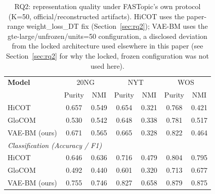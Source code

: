 \begin{table}[t]
\centering
\small
\begin{tabular}{lcccccc}
\toprule
\textbf{Model} & \multicolumn{2}{c}{20NG} & \multicolumn{2}{c}{NYT} & \multicolumn{2}{c}{WOS} \\
 & Purity & NMI & Purity & NMI & Purity & NMI \\
\midrule
HiCOT & 0.657 & 0.549 & 0.654 & 0.321 & 0.768 & 0.421 \\
GloCOM & 0.530 & 0.542 & 0.648 & 0.338 & 0.781 & 0.517 \\
VAE-BM (ours) & 0.671 & 0.565 & 0.665 & 0.328 & 0.822 & 0.464 \\
\midrule
\multicolumn{7}{l}{\textit{Classification (Accuracy / F1)}} \\
HiCOT & 0.646 & 0.636 & 0.716 & 0.479 & 0.804 & 0.795 \\
GloCOM & 0.492 & 0.440 & 0.601 & 0.320 & 0.713 & 0.677 \\
VAE-BM (ours) & 0.755 & 0.746 & 0.827 & 0.658 & 0.879 & 0.875 \\
\bottomrule
\end{tabular}
\caption{RQ2: representation quality under FASTopic's own protocol (K=50, official/reconstructed artifacts). HiCOT uses the paper-range weight\_loss\_DT fix (Section~\ref{sec:rq2}); VAE-BM uses the gte-large/unfrozen/units=50 configuration, a disclosed deviation from the locked architecture used elsewhere in this paper (see Section~\ref{sec:rq2} for why the locked, frozen configuration was not used here).}
\label{tab:rq2_representation_quality}
\end{table}

